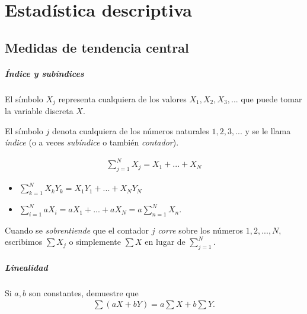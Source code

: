\chapter{Estadística descriptiva}

\section{Medidas de tendencia central}

\paragraph{\'Indice y subíndices}
El símbolo $X_{j}$ representa cualquiera de los  valores $X_{1},X_{2},X_{3},...$ que puede tomar la variable discreta $X.$


El símbolo $j$ denota cualquiera de los números naturales $1,2,3,...$ y se le llama \emph{índice} (o a veces \emph{subíndice} o también \emph{contador}).




\begin{defn}[Sumatoria]
\begin{align}
\sum_{j=1}^{N}X_{j}=X_{1}+...+X_{N}
\end{align}
\end{defn}



\begin{ejemplo}
 \begin{itemize}
  \item $\displaystyle \sum_{k=1}^{N}X_{k}Y_{k}=
  X_{1}Y_{1}+...+X_{N}Y_{N}$
  \item $\displaystyle \sum_{i=1}^{N} aX_{i}=
  aX_{1}+...+aX_{N}=a\sum_{n=1}^{N}X_{n}.$
 \end{itemize}

\end{ejemplo}



\begin{rem}
 Cuando se \emph{sobrentiende} que el contador $j$ \emph{corre} sobre los números $1,2,...,N,$ escribimos $\sum X_{j}$ o simplemente $\sum X$ en lugar de $\sum_{j=1}^{N}.$
\end{rem}


\paragraph{Linealidad}
\begin{problema}
 Si $a,b$ son constantes, demuestre que
 \begin{align}
\sum \left( aX+bY \right)=a\sum X + b\sum Y.
\end{align}
\end{problema}

